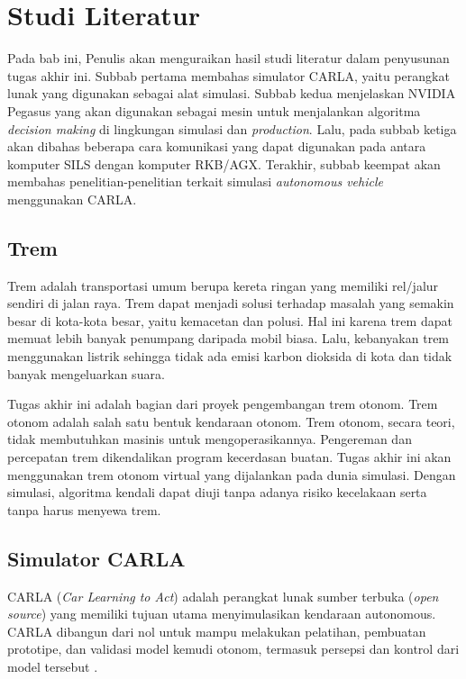 \chapter{Studi Literatur}

Pada bab ini, Penulis akan menguraikan hasil studi literatur dalam penyusunan
tugas akhir ini. Subbab pertama membahas simulator CARLA, yaitu perangkat lunak
yang digunakan sebagai alat simulasi. Subbab kedua menjelaskan NVIDIA Pegasus
yang akan digunakan sebagai mesin untuk menjalankan algoritma \textit{decision
    making} di lingkungan simulasi dan \textit{production}. Lalu, pada subbab ketiga
akan dibahas beberapa cara komunikasi yang dapat digunakan pada antara komputer
SILS dengan komputer RKB/AGX. Terakhir, subbab keempat akan membahas
penelitian-penelitian terkait simulasi \textit{autonomous vehicle} menggunakan
CARLA.

\section{Trem}

Trem adalah transportasi umum berupa kereta ringan yang memiliki rel/jalur
sendiri di jalan raya. Trem dapat menjadi solusi terhadap masalah yang semakin
besar di kota-kota besar, yaitu kemacetan dan polusi. Hal ini karena trem dapat
memuat lebih banyak penumpang daripada mobil biasa. Lalu, kebanyakan trem
menggunakan listrik sehingga tidak ada emisi karbon dioksida di kota dan tidak
banyak mengeluarkan suara.

Tugas akhir ini adalah bagian dari proyek pengembangan trem otonom. Trem otonom
adalah salah satu bentuk kendaraan otonom. Trem otonom, secara teori, tidak
membutuhkan masinis untuk mengoperasikannya. Pengereman dan percepatan trem
dikendalikan program kecerdasan buatan. Tugas akhir ini akan menggunakan trem
otonom virtual yang dijalankan pada dunia simulasi. Dengan simulasi, algoritma
kendali dapat diuji tanpa adanya risiko kecelakaan serta tanpa harus menyewa
trem.

\section{Simulator CARLA}

CARLA (\textit{Car Learning to Act}) adalah perangkat lunak sumber terbuka
(\textit{o\-pen sour\-ce}) yang memiliki tujuan utama menyimulasikan kendaraan
autonomous. CAR\-LA dibangun dari nol untuk mampu melakukan pelatihan, pembuatan
prototipe, dan validasi model kemudi otonom, termasuk persepsi dan kontrol dari
model tersebut \parencite{dos_carla}.

